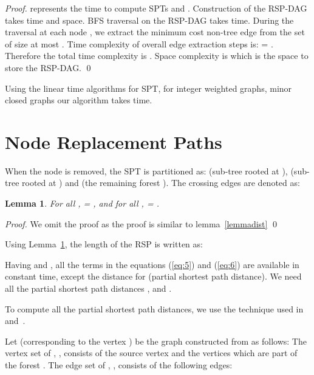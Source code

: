 \documentclass[11pt,a4paper]{llncs}
\newtheorem{lem}[thm]{Lemma}
\begin{document}
\begin{proof}
 represents the time to compute SPTs  and .
Construction of the RSP-DAG takes  time and  space. BFS traversal on the RSP-DAG
takes  time. During the traversal at each node , we
extract the minimum cost non-tree edge from the set of size at most .
Time complexity of overall edge extraction steps is:
 = . Therefore the total time complexity is .
Space complexity is  which is the space to store the RSP-DAG.
\qed
\end{proof}

Using the linear time algorithms for SPT, for integer weighted graphs,
minor closed graphs our algorithm takes  time.

\section{Node Replacement Paths}
\label{nrsp}
When the node  is removed,
the SPT  is partitioned as:
 (sub-tree rooted at ),  (sub-tree rooted at ) and
 (the remaining forest ).
The crossing edges are denoted as:


\begin{lem}
\label{lemmadistvrp}
For all ,  = , and for all ,  = .
\end{lem}

\begin{proof}
\begin{comment}
As , the shortest  path is fully in  and does not include
the vertex . Hence,  = .

To prove , for the sake of contradiction,
let us assume that . It means that,
 uses the vertex . This implies that, .
Since ,  a contradiction.
Hence, .
\end{comment}
We omit the proof as the proof is similar to lemma~\ref{lemmadist}
\qed
\end{proof}

Using Lemma~\ref{lemmadistvrp}, the length of the RSP is written as:


Having  and , all the terms in the equations (\ref{eq:5}) and (\ref{eq:6}) are available in constant time, except the distance  for  (partial shortest path distance).
We need all the partial shortest path distances ,  and .

To compute all the partial shortest path distances, we use the technique used in~\cite{jay} and~\cite{linearrsp}.

Let  (corresponding to the vertex ) be the graph constructed from  as follows:
The vertex set of , , consists of the source vertex  and the vertices which are
part of the forest . The edge set of , , consists of the following edges:
\end{document}
